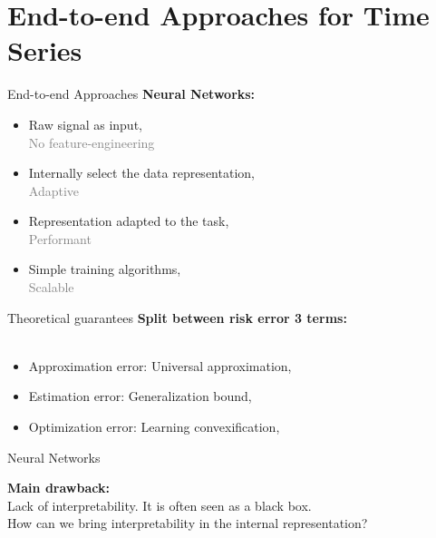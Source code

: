 \documentclass[ignorenonframetext]{beamer}
\def\keypoint#1{\hfill\textcolor{gray}{#1}}
\def\mycite#1{\keypoint{\cite{#1}}}
\begin{document}
\section{End-to-end Approaches for Time Series}


\begin{frame}{End-to-end Approaches}
\Large
{\bf Neural Networks:\\[.3em]}
	\begin{itemize}\itemindent2em\itemsep.25em
		\item Raw signal as input, \\[.25em]
		\keypoint{No feature-engineering}
		\item Internally select the data representation,\\[.25em]
		\keypoint{Adaptive}
		\item Representation adapted to the task,\\[.25em]
		\keypoint{Performant}
		\item Simple training algorithms, \\[.25em]
		\keypoint{Scalable}
	\end{itemize}

\end{frame}


\begin{frame}{Theoretical guarantees}
\Large
	{\bf Split between risk error 3 terms: }\\\mycite{Bottou2008}\\[1em]
	\begin{itemize}\itemsep.3em\itemindent2em
	\item Approximation error: Universal approximation,
	\\[.25em]\mycite{Hornik1991}
	\item Estimation error: Generalization bound,
	\\[.25em]\mycite{Neyshabur2017}
	\item Optimization error: Learning convexification,
	\\[.25em]\mycite{Haeffele2017}
\end{itemize}

\end{frame}

\begin{frame}{Neural Networks}

	\centering \Large
	{\bf Main drawback: }\\[1em]
	Lack of interpretability. It is often seen as a black box.\\[2em]
	
	How can we bring interpretability in the internal representation?

\end{frame}
\end{document}

